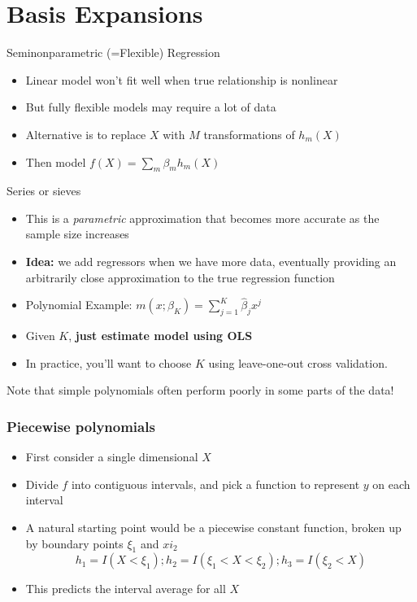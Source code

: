 \section{Basis Expansions}

\begin{frame}{Seminonparametric (=Flexible) Regression}
  \begin{itemize}
    \item Linear model won't fit well when true relationship is nonlinear
    \item But fully flexible models may require a lot of data 
    \item Alternative is to replace $X$ with $M$ transformations of $h_m(X)$
    \item Then model $f(X) = \sum_m \beta_m h_m(X)$
  \end{itemize}
\end{frame}

\begin{frame}{Series or sieves}

  \begin{itemize}
    \item This is a \textit{parametric} approximation that becomes more accurate as the sample size increases
  
    \item {\bf Idea:} we add regressors when we have more data, eventually providing an arbitrarily close approximation to the true regression function
  
    \item Polynomial Example: $ m(x;\beta_K) = \sum_{j=1}^{K} \hat \beta_j x^j$ 
    \item Given $K$, \textbf{just estimate model using OLS}
    \item In practice, you'll want to choose $K$ using leave-one-out cross validation. 
  \end{itemize}
  
  Note that simple polynomials often perform poorly in some parts of the data! 
  
\end{frame}

\begin{frame}
  \frametitle{Piecewise polynomials}
  \begin{itemize}
    \item First consider a single dimensional $X$
    \item Divide $f$ into contiguous intervals, and pick a function to represent $y$ on each interval 
    \item A natural starting point would be a piecewise constant function, broken up by boundary points $\xi_1$ and $xi_2$
    $$ h_1 = I(X < \xi_1) ; h_2 = I(\xi_1 < X < \xi_2); h_3 = I(\xi_2 < X) $$ 
    \item This predicts the interval average for all $X$

  \end{itemize}
\end{frame}    

